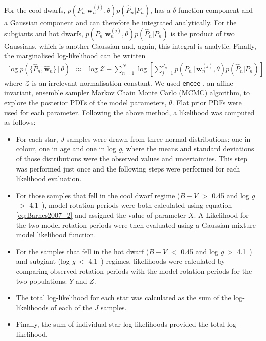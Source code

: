 \documentclass[11pt,preprint]{aastex}
\newcommand{\logg}{log \emph{g}}
\newcommand{\w}{\mathbf{w}}
\newcommand{\subcut}{4.1~}
\begin{document}
For the cool dwarfs, $p(P_n|\mathbf{w}_n^{(j)}, \theta)p(\hat{P}_n|P_n)$,
has a $\delta$-function component and a Gaussian component and can
therefore be integrated analytically.
For the subgiants and hot dwarfs,
$p(P_n|\mathbf{w}_n^{(j)}, \theta)p(\hat{P}_n|P_n)$ is the product of two
Gaussians, which is another Gaussian and, again, this integral is analytic.
Finally, the marginalised log-likelihood can be written
\begin{eqnarray}
	\log p(\{\hat{P}_n,\hat{\w}_n\}\,|\,\theta) &\approx&
	\log \mathcal{Z} + \sum_{n=1}^N
	\log \left[ \sum_{j=1}^{J_n}p(P_n\,|\,\mathbf{w}_n^{(j)}, \theta)p(\hat{P}_n|P_n) \right ]
\end{eqnarray}
where $\mathcal{Z}$ is an irrelevant normalisation constant.
We used {\tt emcee} \citep{Foreman-Mackey2013}, an affine invariant, ensemble
sampler Markov Chain Monte Carlo (MCMC) algorithm, to explore the posterior
PDFs of the model parameters, $\theta$.
Flat prior PDFs were used for each parameter.
Following the above method, a likelihood was computed as follows:
\begin{itemize}
	\item For each star, $J$ samples were drawn from three normal
		distributions: one in colour, one in age and one in \logg,
		where the means and standard deviations of those distributions
		were the observed values and uncertainties.
		This step was performed just once and the
		following steps were performed for each likelihood evaluation.
	\item For those samples that fell in the cool dwarf regime
		($B-V$ $>$ 0.45 and \logg$~>$ \subcut), model rotation
		periods were both calculated using equation
		\ref{eq:Barnes2007_2} and assigned the value of parameter $X$.
		A Likelihood for the two model rotation periods were then
		evaluated using a Gaussian mixture model
		likelihood function.
	\item For the samples that fell in the hot dwarf ($B-V$ $<$ 0.45 and
		\logg$~>$ \subcut) and subgiant (\logg$~<$ \subcut) regimes,
		likelihoods were calculated by comparing observed rotation
		periods with the model rotation periods for the two
		populations: $Y$ and $Z$.
	\item The total log-likelihood for each star was calculated as the
		sum of the log-likelihoods of each of the $J$ samples.
	\item Finally, the sum of individual star log-likelihoods
		provided the total log-likelihood.
\end{itemize}
\end{document}
